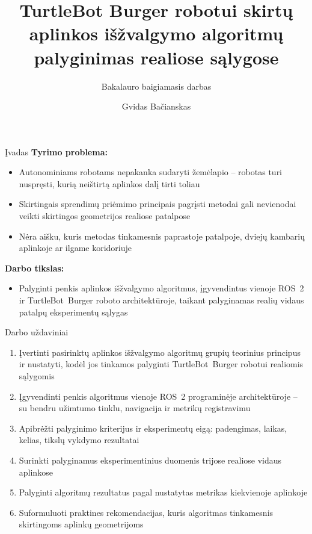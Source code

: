 \documentclass[12pt]{beamer}
\title[]{TurtleBot Burger robotui skirtų aplinkos išžvalgymo algoritmų palyginimas realiose sąlygose}
\subtitle[]{Bakalauro baigiamasis darbas}
\author[Gvidas Bačianskas]{Gvidas Bačianskas}
\date{}
\begin{document}
\begin{frame}
    \titlepage
\end{frame}

\begin{frame}{Įvadas}
    \textbf{Tyrimo problema:}
    \begin{itemize}
        \item Autonominiams robotams nepakanka sudaryti žemėlapio -- robotas turi nuspręsti, kurią neištirtą aplinkos dalį tirti toliau
        \item Skirtingais sprendimų priėmimo principais pagrįsti metodai gali nevienodai veikti skirtingos geometrijos realiose patalpose
        \item Nėra aišku, kuris metodas tinkamesnis paprastoje patalpoje, dviejų kambarių aplinkoje ar ilgame koridoriuje
    \end{itemize}

    \vspace{0.4cm}
    \textbf{Darbo tikslas:}
    \begin{itemize}
        \item Palyginti penkis aplinkos išžvalgymo algoritmus, įgyvendintus vienoje ROS~2 ir TurtleBot~Burger roboto architektūroje, taikant palyginamas realių vidaus patalpų eksperimentų sąlygas
    \end{itemize}
\end{frame}

\begin{frame}{Darbo uždaviniai}
    \begin{enumerate}
        \item Įvertinti pasirinktų aplinkos išžvalgymo algoritmų grupių teorinius principus ir nustatyti, kodėl jos tinkamos palyginti TurtleBot~Burger robotui realiomis sąlygomis
        \item Įgyvendinti penkis algoritmus vienoje ROS~2 programinėje architektūroje -- su bendru užimtumo tinklu, navigacija ir metrikų registravimu
        \item Apibrėžti palyginimo kriterijus ir eksperimentų eigą: padengimas, laikas, kelias, tikslų vykdymo rezultatai
        \item Surinkti palyginamus eksperimentinius duomenis trijose realiose vidaus aplinkose
        \item Palyginti algoritmų rezultatus pagal nustatytas metrikas kiekvienoje aplinkoje
        \item Suformuluoti praktines rekomendacijas, kuris algoritmas tinkamesnis skirtingoms aplinkų geometrijoms
    \end{enumerate}
\end{frame}
\end{document}
